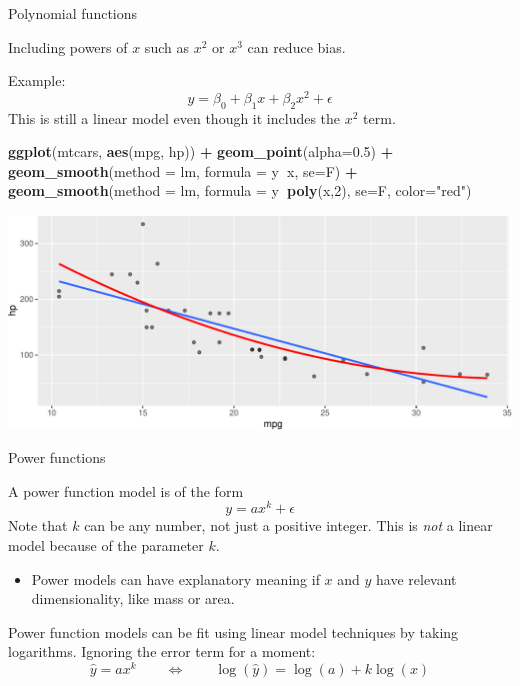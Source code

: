 \documentclass[
  ignorenonframetext,
]{beamer}
\newenvironment{Shaded}{\begin{snugshade}}{\end{snugshade}}
\newcommand{\DataTypeTok}[1]{\textcolor[rgb]{0.13,0.29,0.53}{#1}}
\newcommand{\DecValTok}[1]{\textcolor[rgb]{0.00,0.00,0.81}{#1}}
\newcommand{\FloatTok}[1]{\textcolor[rgb]{0.00,0.00,0.81}{#1}}
\newcommand{\KeywordTok}[1]{\textcolor[rgb]{0.13,0.29,0.53}{\textbf{#1}}}
\newcommand{\NormalTok}[1]{#1}
\newcommand{\OperatorTok}[1]{\textcolor[rgb]{0.81,0.36,0.00}{\textbf{#1}}}
\newcommand{\StringTok}[1]{\textcolor[rgb]{0.31,0.60,0.02}{#1}}
\providecommand{\tightlist}{%
  \setlength{\itemsep}{0pt}\setlength{\parskip}{0pt}}
\begin{document}
\begin{frame}[fragile]{Polynomial functions}
\protect\hypertarget{polynomial-functions}{}

Including powers of \(x\) such as \(x^2\) or \(x^3\) can reduce bias.

Example: \[
y=\beta_0+\beta_1 x + \beta_2 x^2 +\epsilon
\] This is still a linear model even though it includes the \(x^2\)
term.

\scriptsize

\begin{Shaded}
\begin{Highlighting}[]
\KeywordTok{ggplot}\NormalTok{(mtcars, }\KeywordTok{aes}\NormalTok{(mpg, hp)) }\OperatorTok{+}\StringTok{ }\KeywordTok{geom_point}\NormalTok{(}\DataTypeTok{alpha=}\FloatTok{0.5}\NormalTok{) }\OperatorTok{+}
\StringTok{  }\KeywordTok{geom_smooth}\NormalTok{(}\DataTypeTok{method =}\NormalTok{ lm, }\DataTypeTok{formula =}\NormalTok{ y}\OperatorTok{~}\NormalTok{x, }\DataTypeTok{se=}\NormalTok{F) }\OperatorTok{+}
\StringTok{  }\KeywordTok{geom_smooth}\NormalTok{(}\DataTypeTok{method =}\NormalTok{ lm, }\DataTypeTok{formula =}\NormalTok{ y}\OperatorTok{~}\KeywordTok{poly}\NormalTok{(x,}\DecValTok{2}\NormalTok{), }\DataTypeTok{se=}\NormalTok{F, }\DataTypeTok{color=}\StringTok{"red"}\NormalTok{)}
\end{Highlighting}
\end{Shaded}

\includegraphics{signal_files/figure-beamer/unnamed-chunk-2-1.pdf}

\end{frame}

\begin{frame}{Power functions}
\protect\hypertarget{power-functions}{}

A power function model is of the form \[
y=a x^k + \epsilon
\] Note that \(k\) can be any number, not just a positive integer. This
is \emph{not} a linear model because of the parameter \(k\).

\begin{itemize}
\tightlist
\item
  Power models can have explanatory meaning if \(x\) and \(y\) have
  relevant dimensionality, like mass or area.
\end{itemize}

Power function models can be fit using linear model techniques by taking
logarithms. Ignoring the error term for a moment: \[
\hat{y}=a x^k \qquad \iff \qquad \log(\hat{y})=\log(a)+k\log(x)
\]

\end{frame}
\end{document}
